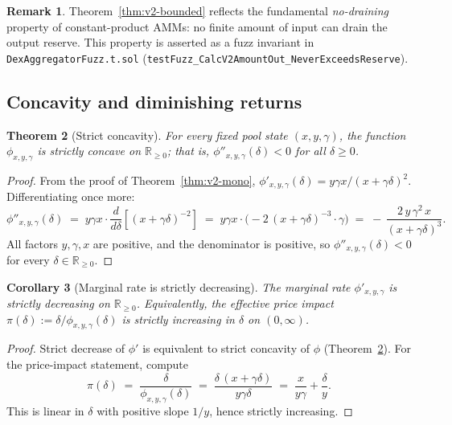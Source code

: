 \documentclass[11pt,a4paper]{article}
\newtheorem{theorem}{Theorem}[section]
\newtheorem{corollary}[theorem]{Corollary}
\theoremstyle{definition}
\newtheorem{remark}[theorem]{Remark}
\newcommand{\R}{\mathbb{R}}
\newcommand{\Rnn}{\R_{\geq 0}}
\begin{document}
\begin{remark}
Theorem~\ref{thm:v2-bounded} reflects the fundamental \emph{no-draining} property
of constant-product AMMs: no finite amount of input can drain the output
reserve. This property is asserted as a fuzz invariant in
\texttt{DexAggregatorFuzz.t.sol} (\texttt{testFuzz\_CalcV2AmountOut\_NeverExceedsReserve}).
\end{remark}

\subsection{Concavity and diminishing returns}

\begin{theorem}[Strict concavity]
\label{thm:v2-concave}
For every fixed pool state $(x,y,\gamma)$, the function $\phi_{x,y,\gamma}$ is
strictly concave on $\Rnn$; that is, $\phi''_{x,y,\gamma}(\delta) < 0$ for all
$\delta \geq 0$.
\end{theorem}

\begin{proof}
From the proof of Theorem~\ref{thm:v2-mono},
$\phi'_{x,y,\gamma}(\delta) = y\gamma x / (x + \gamma\delta)^2$.
Differentiating once more:
\[
    \phi''_{x,y,\gamma}(\delta)
    \;=\; y\gamma x \cdot \frac{d}{d\delta}\!\left[ (x + \gamma\delta)^{-2} \right]
    \;=\; y\gamma x \cdot \bigl( -2\,(x + \gamma\delta)^{-3} \cdot \gamma \bigr)
    \;=\; -\,\frac{2\,y\,\gamma^2 \,x}{(x + \gamma\delta)^3}.
\]
All factors $y, \gamma, x$ are positive, and the denominator is positive, so
$\phi''_{x,y,\gamma}(\delta) < 0$ for every $\delta \in \Rnn$.
\end{proof}

\begin{corollary}[Marginal rate is strictly decreasing]
\label{cor:marginal-dec}
The marginal rate $\phi'_{x,y,\gamma}$ is strictly decreasing on $\Rnn$.
Equivalently, the effective \emph{price impact}
$\pi(\delta) := \delta / \phi_{x,y,\gamma}(\delta)$ is strictly increasing
in $\delta$ on $(0, \infty)$.
\end{corollary}

\begin{proof}
Strict decrease of $\phi'$ is equivalent to strict concavity of $\phi$
(Theorem~\ref{thm:v2-concave}). For the price-impact statement, compute
\[
    \pi(\delta) \;=\; \frac{\delta}{\phi_{x,y,\gamma}(\delta)}
    \;=\; \frac{\delta \,(x + \gamma\delta)}{y\gamma\delta}
    \;=\; \frac{x}{y\gamma} + \frac{\delta}{y}.
\]
This is linear in $\delta$ with positive slope $1/y$, hence strictly increasing.
\end{proof}
\end{document}
